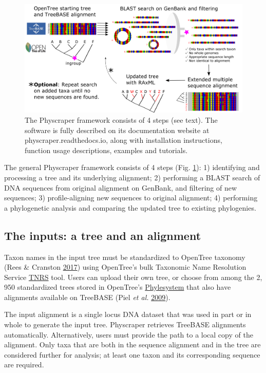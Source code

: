 \documentclass[]{article}
\begin{document}
\begin{figure}

{\centering \includegraphics[width=0.85\linewidth]{docs/figs/schematic-4} 

}

\caption{The Physcraper framework consists of 4 steps (see text). The software is fully described on its documentation website at physcraper.readthedocs.io, along with installation instructions, function usage descriptions, examples and tutorials.}\label{fig:framework}
\end{figure}

The general Physcraper framework consists of 4 steps (Fig. \ref{fig:framework}): 1) identifying and processing a tree and its underlying alignment; 2) performing a BLAST search of DNA sequences from original alignment on GenBank, and filtering of new sequences; 3) profile-aligning new sequences to original alignment; 4) performing a phylogenetic analysis and comparing the updated tree to existing phylogenies.

\hypertarget{the-inputs-a-tree-and-an-alignment}{%
\subsection{The inputs: a tree and an alignment}\label{the-inputs-a-tree-and-an-alignment}}

Taxon names in the input tree must be standardized to OpenTree taxonomy (Rees \& Cranston \protect\hyperlink{ref-rees2017automated}{2017}) using OpenTree's bulk Taxonomic Name Resolution Service \href{https://tree.opentreeoflife.org/curator/tnrs/}{TNRS} tool. Users can upload their own tree, or choose from among the 2, 950 standardized trees stored in OpenTree's \href{https://github.com/opentreeoflife/phylesystem}{Phylesystem} that also have alignments available on TreeBASE (Piel \emph{et al.} \protect\hyperlink{ref-piel2009treebase}{2009}).

The input alignment is a single locus DNA dataset that was used in part or in whole to generate the input tree. Physcraper retrieves TreeBASE alignments automatically. Alternatively, users must provide the path to a local copy of the alignment.
Only taxa that are both in the sequence alignment and in the tree are considered further for analysis; at least one taxon and its corresponding sequence are required.
\end{document}
